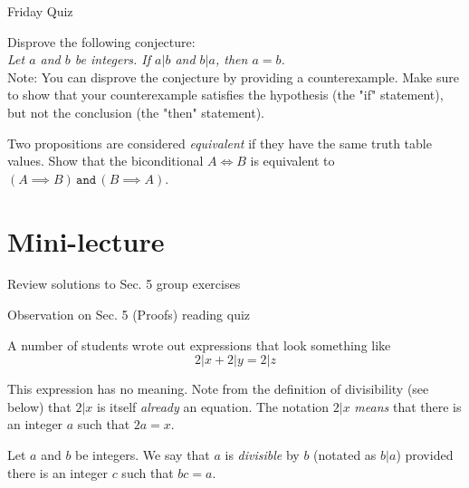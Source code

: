 \documentclass[10pt]{beamer}
\begin{document}
\begin{frame}{Friday Quiz}


 \begin{mygreenbox}[title=Reading Quiz (Sec. 6 - Counterexamples)]
Disprove the following conjecture: \\
\vfill 
\textit{Let $a$ and $b$ be integers.  If $a|b$ and $b|a$, then $a=b$.}  \\
\vfill 
Note: You can disprove the conjecture by providing a counterexample.  Make sure to show that your counterexample satisfies the hypothesis (the "if" statement), but not the conclusion (the "then" statement).
\vfill 
\end{mygreenbox}

\vfill \vfill 


 \begin{mygreenbox}[title=Problems Quiz (Sec. 4 - Theorems)]
Two propositions are considered \textit{equivalent} if they have the same truth table values.  Show that the biconditional $A \iff B$ is equivalent to $(A \implies B) \, \texttt{and} \, (B \implies A)$.
\end{mygreenbox}
\end{frame}

\section{Mini-lecture}

\begin{frame}[standout]

\vfill 
\alert{Review solutions to Sec. 5 group exercises}
\vfill

\end{frame}


\begin{frame}{Observation on Sec. 5 (Proofs) reading quiz}

\begin{myyellowbox}[title=\textbf{Observation}] 
A number of students wrote out expressions that look something like
\[ 2|x + 2|y = 2|z\]
\end{myyellowbox}

\begin{myredbox}[title=\textbf{Warning}] 
This expression has no meaning.    Note from the definition of divisibility (see below) that $2|x$ is itself \textit{already} an equation.  The notation $2|x$  \textit{means} that there is an integer $a$ such that $2a=x$.	
\end{myredbox}


\vfill 
\begin{mydef}[title=Definition (\textbf{Divisible})]
Let $a$ and $b$ be integers.  We say that $a$ is \textit{divisible} by $b$ (notated as $b|a$) provided there is an integer $c$ such that $bc=a$.  
\end{mydef}


\end{frame}
\end{document}
